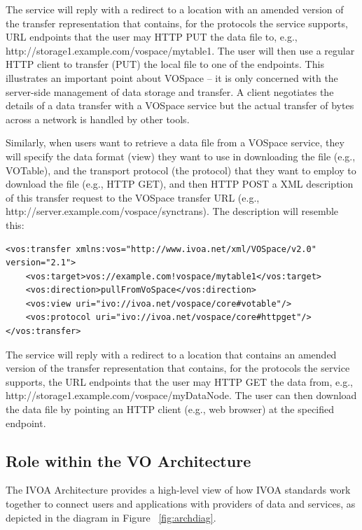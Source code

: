 \documentclass[11pt,a4paper]{ivoa}
\begin{document}
The service will reply with a redirect to a location with an amended version of the transfer representation that contains, for the protocols the service supports, URL endpoints that the user may HTTP PUT the data file to, e.g., http://storage1.example.com/vospace/mytable1.  The user will then use a regular HTTP client to transfer (PUT) the local file to one of the endpoints. This illustrates an important point about VOSpace -- it is only concerned with the server-side management of data storage and transfer. A client negotiates the details of a data transfer with a VOSpace service but the actual transfer of bytes across a network is handled by other tools.

Similarly, when users want to retrieve a data file from a VOSpace service, they will specify the data format (view) they want to use in downloading the file (e.g., VOTable), and the transport protocol (the protocol) that they want to employ to download the file (e.g., HTTP GET), and then HTTP POST a XML description of this transfer request to the VOSpace transfer URL (e.g., http://server.example.com/vospace/synctrans). The description will resemble this:

\begin{lstlisting}
<vos:transfer xmlns:vos="http://www.ivoa.net/xml/VOSpace/v2.0" version="2.1">
    <vos:target>vos://example.com!vospace/mytable1</vos:target>
    <vos:direction>pullFromVoSpace</vos:direction> 
    <vos:view uri="ivo://ivoa.net/vospace/core#votable"/> 
    <vos:protocol uri="ivo://ivoa.net/vospace/core#httpget"/>  
</vos:transfer>
\end{lstlisting}

The service will reply with a redirect to a location that contains an amended version of the transfer representation that contains, for the protocols the service supports, the URL endpoints that the user may HTTP GET the data from, e.g., http://storage1.example.com/vospace/myDataNode. The user can then download the data file by pointing an HTTP client (e.g., web browser) at the specified endpoint.

\subsection{Role within the VO Architecture}
\label{subsec:role within the vo architecture}

The IVOA Architecture \citep{note:VOARCH} provides a high-level view of how IVOA standards work together to connect users and applications with providers of data and services, as depicted in the diagram in Figure ~\ref{fig:archdiag}.
\end{document}
